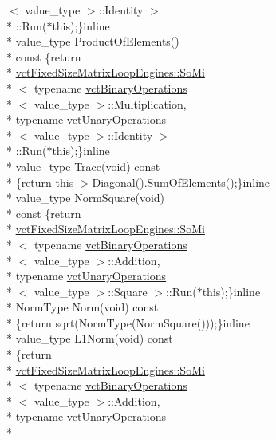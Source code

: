 \begin{DoxyCompactItemize}
$<$ value\-\_\-type $>$\-::Identity $>$\\*
\-::Run($\ast$this);\}inline \\*
value\-\_\-type Product\-Of\-Elements() \\*
const \{return \\*
\hyperlink{classvct_fixed_size_matrix_loop_engines_1_1_so_mi}{vct\-Fixed\-Size\-Matrix\-Loop\-Engines\-::\-So\-Mi}\\*
$<$ typename \hyperlink{classvct_binary_operations}{vct\-Binary\-Operations}\\*
$<$ value\-\_\-type $>$\-::Multiplication, \\*
typename \hyperlink{classvct_unary_operations}{vct\-Unary\-Operations}\\*
$<$ value\-\_\-type $>$\-::Identity $>$\\*
\-::Run($\ast$this);\}inline \\*
value\-\_\-type Trace(void) const \\*
\{return this-\/$>$Diagonal().Sum\-Of\-Elements();\}inline \\*
value\-\_\-type Norm\-Square(void) \\*
const \{return \\*
\hyperlink{classvct_fixed_size_matrix_loop_engines_1_1_so_mi}{vct\-Fixed\-Size\-Matrix\-Loop\-Engines\-::\-So\-Mi}\\*
$<$ typename \hyperlink{classvct_binary_operations}{vct\-Binary\-Operations}\\*
$<$ value\-\_\-type $>$\-::Addition, \\*
typename \hyperlink{classvct_unary_operations}{vct\-Unary\-Operations}\\*
$<$ value\-\_\-type $>$\-::Square $>$\-::Run($\ast$this);\}inline \\*
Norm\-Type Norm(void) const \\*
\{return sqrt(Norm\-Type(Norm\-Square()));\}inline \\*
value\-\_\-type L1\-Norm(void) const \\*
\{return \\*
\hyperlink{classvct_fixed_size_matrix_loop_engines_1_1_so_mi}{vct\-Fixed\-Size\-Matrix\-Loop\-Engines\-::\-So\-Mi}\\*
$<$ typename \hyperlink{classvct_binary_operations}{vct\-Binary\-Operations}\\*
$<$ value\-\_\-type $>$\-::Addition, \\*
typename \hyperlink{classvct_unary_operations}{vct\-Unary\-Operations}\\*

\end{DoxyCompactItemize}
